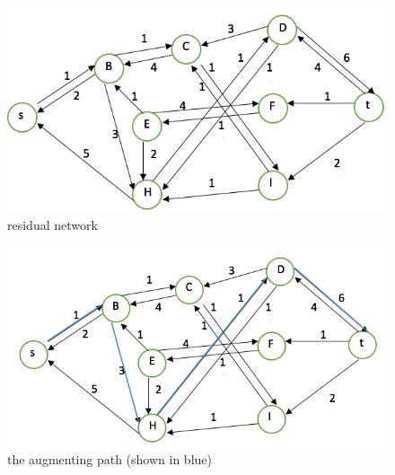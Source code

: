 \begin{problem}{1} ~\\

\begin{figure}[H] 
\centering 
\includegraphics[width=0.6\columnwidth]{1}
\caption{residual network}
\end{figure}

\begin{figure}[H] 
\centering 
\includegraphics[width=0.6\columnwidth]{2}
\caption{the augmenting path (shown in blue)}
\end{figure}

\end{problem}